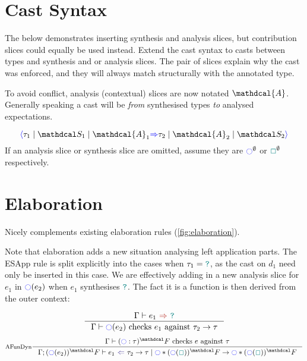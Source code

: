 \section{Cast Syntax}
\renewcommand{\A}{\mathdcal{A}}
The below demonstrates inserting synthesis and analysis slices, but contribution slices could equally be used instead. Extend the cast syntax to casts between types and synthesis and or analysis slices. The pair of slices explain why the cast was enforced, and they will always match structurally with the annotated type.

To avoid conflict, analysis (contextual) slices are now notated $\A$. Generally speaking a cast will be \textit{from} synthesised types \textit{to} analysed expectations.

\[\scast{\tau_1 \mid \S_1 \mid \A_1}{\tau_2 \mid \A_2 \mid \S_2}\] If an analysis slice or synthesis slice are omitted, assume they are $\cmark^\emptyset$ or ${\color{teal}\Box}^\emptyset$ respectively.

\section{Elaboration}
\label{sec:CastSlicingElaboration}
Nicely complements existing elaboration rules (\cref{fig:elaboration}). 

Note that elaboration adds a new situation analysing left application parts. The ESApp rule is split explicitly into the cases when $\tau_1 = {\color{teal}\texttt{?}}$, as the cast on $d_1$ need only be inserted in this case. We are effectively adding in a new analysis slice for $e_1$ in $\cmark(e_2)$ when $e_1$ synthesises ${\color{teal}\texttt{?}}$. The fact it is a function is then derived from the outer context:
\begin{definition}
\[\inference{\synthesis{e_1}{\dyn}}{\Gamma \vdash \cmark(e_2) \text{ checks } e_1 \text{ against } \tau_2 \to \tau}\]
\[\inference[AFunDyn]{\Gamma \vdash (\cmark : \tau)^\F \text{ checks } e \text{ against } \tau}{\analysisslice{(\cmark(e_2))^\F}{e_1}{\tau_2 \to \tau}{\cmark * (\cmark(\gap))^\F \to \cmark * (\cmark(\gap))^\F}}\]
\end{definition}


